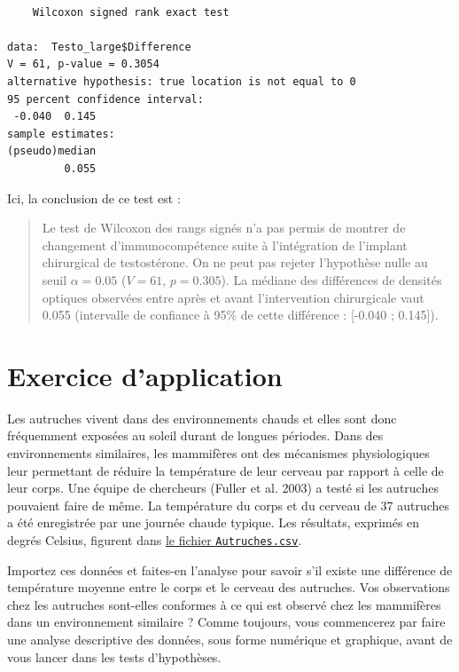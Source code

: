\documentclass[
  a4paper,
  DIV=11,
  numbers=noendperiod,
  oneside]{scrreprt}
\begin{document}
\begin{verbatim}

    Wilcoxon signed rank exact test

data:  Testo_large$Difference
V = 61, p-value = 0.3054
alternative hypothesis: true location is not equal to 0
95 percent confidence interval:
 -0.040  0.145
sample estimates:
(pseudo)median 
         0.055 
\end{verbatim}

Ici, la conclusion de ce test est :

\begin{quote}
Le test de Wilcoxon des rangs signés n'a pas permis de montrer de
changement d'immunocompétence suite à l'intégration de l'implant
chirurgical de testostérone. On ne peut pas rejeter l'hypothèse nulle au
seuil \(\alpha = 0.05\) (\(V = 61\), \(p = 0.305\)). La médiane des
différences de densités optiques observées entre après et avant
l'intervention chirurgicale vaut 0.055 (intervalle de confiance à 95\%
de cette différence : {[}-0.040 ; 0.145{]}).
\end{quote}

\hypertarget{exercice-dapplication-1}{%
\section{Exercice d'application}\label{exercice-dapplication-1}}

Les autruches vivent dans des environnements chauds et elles sont donc
fréquemment exposées au soleil durant de longues périodes. Dans des
environnements similaires, les mammifères ont des mécanismes
physiologiques leur permettant de réduire la température de leur cerveau
par rapport à celle de leur corps. Une équipe de chercheurs (Fuller et
al. 2003) a testé si les autruches pouvaient faire de même. La
température du corps et du cerveau de 37 autruches a été enregistrée par
une journée chaude typique. Les résultats, exprimés en degrés Celsius,
figurent dans \href{data/Autruches.csv}{le fichier
\texttt{Autruches.csv}}.

Importez ces données et faites-en l'analyse pour savoir s'il existe une
différence de température moyenne entre le corps et le cerveau des
autruches. Vos observations chez les autruches sont-elles conformes à ce
qui est observé chez les mammifères dans un environnement similaire ?
Comme toujours, vous commencerez par faire une analyse descriptive des
données, sous forme numérique et graphique, avant de vous lancer dans
les tests d'hypothèses.
\end{document}
